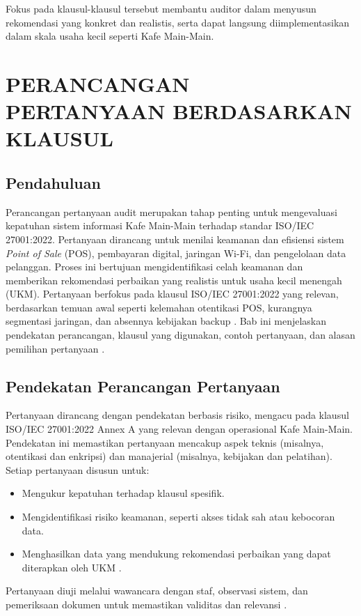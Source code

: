 \documentclass[12pt, a4paper]{report}
\begin{document}
Fokus pada klausul-klausul tersebut membantu auditor dalam menyusun rekomendasi yang konkret dan realistis, serta dapat langsung diimplementasikan dalam skala usaha kecil seperti Kafe Main-Main.

\chapter{PERANCANGAN PERTANYAAN BERDASARKAN KLAUSUL}
\label{bab:pertanyaan}

\section{Pendahuluan}
Perancangan pertanyaan audit merupakan tahap penting untuk mengevaluasi kepatuhan sistem informasi Kafe Main-Main terhadap standar ISO/IEC 27001:2022. Pertanyaan dirancang untuk menilai keamanan dan efisiensi sistem \textit{Point of Sale} (POS), pembayaran digital, jaringan Wi-Fi, dan pengelolaan data pelanggan. Proses ini bertujuan mengidentifikasi celah keamanan dan memberikan rekomendasi perbaikan yang realistis untuk usaha kecil menengah (UKM). Pertanyaan berfokus pada klausul ISO/IEC 27001:2022 yang relevan, berdasarkan temuan awal seperti kelemahan otentikasi POS, kurangnya segmentasi jaringan, dan absennya kebijakan backup \citep{auditkafe2025, laporanaudit}. Bab ini menjelaskan pendekatan perancangan, klausul yang digunakan, contoh pertanyaan, dan alasan pemilihan pertanyaan \citep{iso27001, frangky2024implementasi}.

\section{Pendekatan Perancangan Pertanyaan}
Pertanyaan dirancang dengan pendekatan berbasis risiko, mengacu pada klausul ISO/IEC 27001:2022 Annex A yang relevan dengan operasional Kafe Main-Main. Pendekatan ini memastikan pertanyaan mencakup aspek teknis (misalnya, otentikasi dan enkripsi) dan manajerial (misalnya, kebijakan dan pelatihan). Setiap pertanyaan disusun untuk:
\begin{itemize}
    \item Mengukur kepatuhan terhadap klausul spesifik.
    \item Mengidentifikasi risiko keamanan, seperti akses tidak sah atau kebocoran data.
    \item Menghasilkan data yang mendukung rekomendasi perbaikan yang dapat diterapkan oleh UKM \citep{rokhman2018implementasi}.
\end{itemize}
Pertanyaan diuji melalui wawancara dengan staf, observasi sistem, dan pemeriksaan dokumen untuk memastikan validitas dan relevansi \citep{permatasari2023manajemen}.
\end{document}
